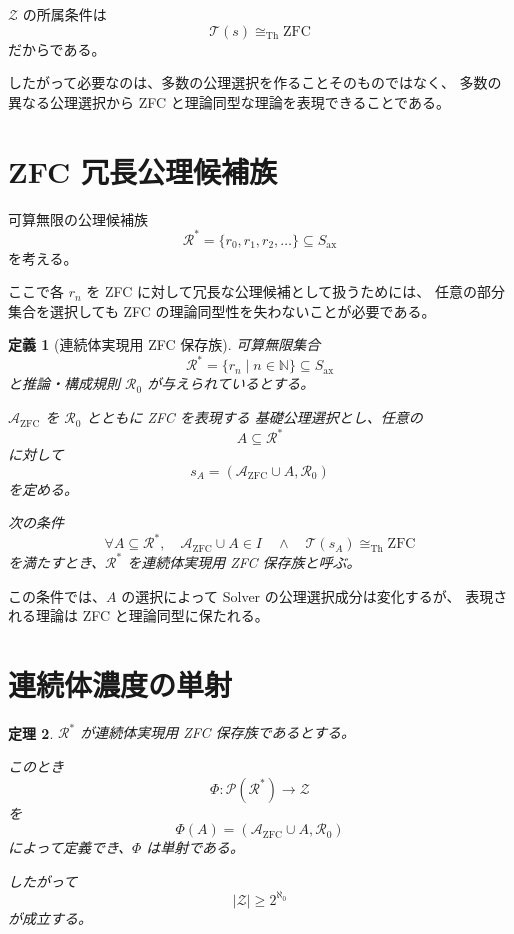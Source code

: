 \documentclass[a4paper,11pt]{jsarticle}
\newtheorem{definition}{定義}[section]
\newtheorem{theorem}[definition]{定理}
\newcommand{\Ax}{S_{\mathrm{ax}}}
\begin{document}
$\mathcal{Z}$ の所属条件は
\[
\mathcal{T}(s)\cong_{\mathrm{Th}}\mathrm{ZFC}
\]
だからである。

したがって必要なのは、多数の公理選択を作ることそのものではなく、
多数の異なる公理選択から ZFC と理論同型な理論を表現できることである。

\section{ZFC 冗長公理候補族}

可算無限の公理候補族
\[
\mathcal{R}^*=\{r_0,r_1,r_2,\ldots\}\subseteq\Ax
\]
を考える。

ここで各 $r_n$ を ZFC に対して冗長な公理候補として扱うためには、
任意の部分集合を選択しても ZFC の理論同型性を失わないことが必要である。

\begin{definition}[連続体実現用 ZFC 保存族]
可算無限集合
\[
\mathcal{R}^*=\{r_n\mid n\in\mathbb{N}\}\subseteq\Ax
\]
と推論・構成規則 $\mathcal{R}_0$ が与えられているとする。

$\mathcal{A}_{\mathrm{ZFC}}$ を $\mathcal{R}_0$ とともに ZFC を表現する
基礎公理選択とし、任意の
\[
A\subseteq\mathcal{R}^*
\]
に対して
\[
s_A=
\left(
\mathcal{A}_{\mathrm{ZFC}}\cup A,\mathcal{R}_0
\right)
\]
を定める。

次の条件
\[
\boxed{
\forall A\subseteq\mathcal{R}^*,
\quad
\mathcal{A}_{\mathrm{ZFC}}\cup A\in I
\quad\land\quad
\mathcal{T}(s_A)\cong_{\mathrm{Th}}\mathrm{ZFC}
}
\]
を満たすとき、$\mathcal{R}^*$ を連続体実現用 ZFC 保存族と呼ぶ。
\end{definition}

この条件では、$A$ の選択によって Solver の公理選択成分は変化するが、
表現される理論は ZFC と理論同型に保たれる。

\section{連続体濃度の単射}

\begin{theorem}
$\mathcal{R}^*$ が連続体実現用 ZFC 保存族であるとする。

このとき
\[
\Phi:\mathcal{P}(\mathcal{R}^*)\to\mathcal{Z}
\]
を
\[
\boxed{
\Phi(A)=
\left(
\mathcal{A}_{\mathrm{ZFC}}\cup A,\mathcal{R}_0
\right)
}
\]
によって定義でき、$\Phi$ は単射である。

したがって
\[
\boxed{
|\mathcal{Z}|\geq2^{\aleph_0}
}
\]
が成立する。
\end{theorem}
\end{document}
